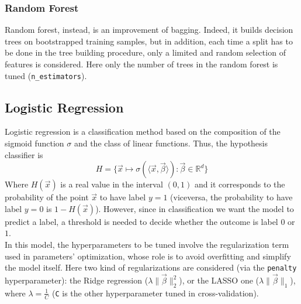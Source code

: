 \documentclass[letterpaper]{article}
\begin{document}
	\subsubsection{Random Forest}
	Random forest, instead, is an improvement of bagging. Indeed, it builds decision trees on bootstrapped training samples, but in addition, each time a split has to be done in the tree building procedure, only a limited and random selection of features is considered. Here only the number of trees in the random forest is tuned (\texttt{n\_estimators}).
	\subsection{Logistic Regression}
	Logistic regression is a classification method based on the composition of the sigmoid function $\sigma$ and the class of linear functions. Thus, the hypothesis classifier is 
	\begin{equation}
		H = \{ \vec{x}\mapsto \sigma(\langle\vec{x},\vec{\beta}\rangle) : \vec{\beta}\in\mathbb{R}^d\}
	\end{equation}
	Where $H(\vec{x})$ is a real value in the interval $(0,1)$ and it corresponds to the probability of the point $\vec{x}$ to have label $y = 1$ (viceversa, the probability to have label $y=0$ is $1-H(\vec{x})$). However, since in classification we want the model to predict a label, a threshold is needed to decide whether the outcome is label $0$ or $1$. \\
	In this model, the hyperparameters to be tuned involve the regularization term used in parameters' optimization, whose role is to avoid overfitting and simplify the model itself. Here two kind of regularizations are considered (via the \texttt{penalty} hyperparameter): the Ridge regression ($\lambda\lVert{\vec{\beta}}\rVert^2_2$), or the LASSO one ($\lambda\lVert{\vec{\beta}}\rVert_1$), where $\lambda = \frac{1}{C}$ (\texttt{C} is the other hyperparameter tuned in cross-validation).
\end{document}
